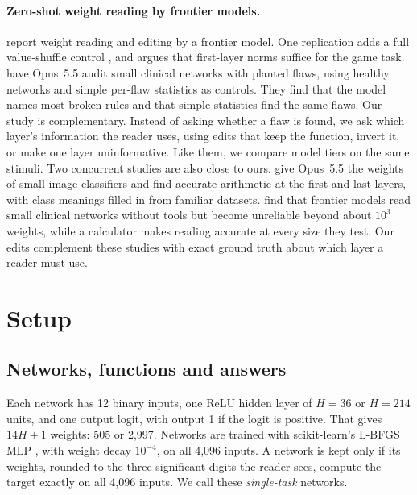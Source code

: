 \documentclass[10pt]{article}
\newcommand{\Opus}{Opus~5.5}
\begin{document}
\paragraph{Zero-shot weight reading by frontier models.} \citet{takehi2026sparks} report weight reading and editing by a frontier model. One replication adds a full value-shuffle control \citep{turing2026weights}, and \citet{goedecke2026} argues that first-layer norms suffice for the game task. \citet{nusrat2026auditing} have \Opus{} audit small clinical networks with planted flaws, using healthy networks and simple per-flaw statistics as controls. They find that the model names most broken rules and that simple statistics find the same flaws. Our study is complementary. Instead of asking whether a flaw is found, we ask which layer's information the reader uses, using edits that keep the function, invert it, or make one layer uninformative. Like them, we compare model tiers on the same stimuli. Two concurrent studies are also close to ours. \citet{ahmed2026memorization} give \Opus{} the weights of small image classifiers and find accurate arithmetic at the first and last layers, with class meanings filled in from familiar datasets. \citet{liu2026computation} find that frontier models read small clinical networks without tools but become unreliable beyond about $10^3$ weights, while a calculator makes reading accurate at every size they test. Our edits complement these studies with exact ground truth about which layer a reader must use.

\section{Setup}
\label{sec:setup}
\subsection{Networks, functions and answers}
Each network has 12 binary inputs, one ReLU hidden layer of $H=36$ or $H=214$ units, and one output logit, with output 1 if the logit is positive. That gives $14H+1$ weights: 505 or 2,997. Networks are trained with scikit-learn's L-BFGS MLP \citep{pedregosa2011sklearn}, with weight decay $10^{-4}$, on all 4,096 inputs. A network is kept only if its weights, rounded to the three significant digits the reader sees, compute the target exactly on all 4,096 inputs. We call these \emph{single-task} networks.
\end{document}
